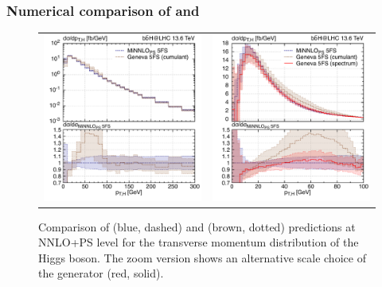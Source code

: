 \documentclass[11pt,a4paper]{article}
\begin{document}
\subsubsection{Numerical comparison of \minnlo{} and \GENEVA{}}
\begin{figure}[t!]
\begin{center}
\begin{tabular}{cc}
\includegraphics[width=.45\textwidth, page=1]{plots/5fs/genevaminnlo/minnloKQvar-geneva-ptH.pdf}&
\includegraphics[width=.45\textwidth, page=1]{plots/5fs/genevaminnlo/minnloKQvar-genevaspec-ptHzoom.pdf}
\end{tabular}
\vspace*{1ex}
\caption{Comparison of \minnlo{} (blue, dashed) and \GENEVA{} (brown, dotted) predictions at NNLO+PS level for the transverse momentum distribution of the Higgs boson. The zoom version shows an alternative scale choice of the \GENEVA{} generator (red, solid).\label{fig:genevaptH}}
\end{center}
\end{figure}
\end{document}
